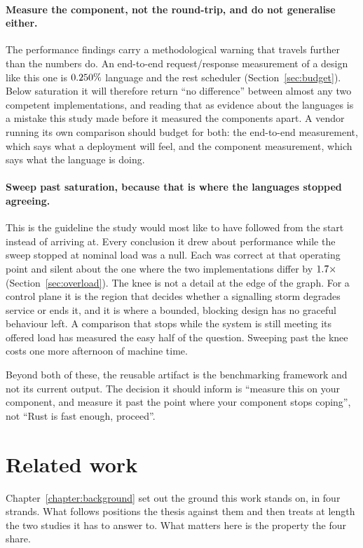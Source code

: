 \documentclass[english,oneside,a4paper,censored,csm,software-track-2020]{HYthesisML}
\begin{document}
\paragraph{Measure the component, not the round-trip, and do not generalise either.}
The performance findings carry a methodological warning that travels further than the
numbers do. An end-to-end request/response measurement of a design like this one is
$0.250\%$ language and the rest scheduler (Section~\ref{sec:budget}). Below
saturation it will therefore return ``no difference'' between almost any two competent
implementations, and reading that as evidence about the languages is a mistake this study made
before it measured the components apart. A vendor running its own comparison should budget for
both: the end-to-end measurement, which says what a deployment will feel, and the component
measurement, which says what the language is doing.

\paragraph{Sweep past saturation, because that is where the languages stopped agreeing.}
This is the guideline the study would most like to have followed from the start instead of
arriving at. Every conclusion it drew about performance while the sweep stopped at nominal load
was a null. Each was correct at that operating point and silent about the one where the two
implementations differ by $1.7\times$ (Section~\ref{sec:overload}). The knee is
not a detail at the edge of the graph. For a control plane it is the region that decides whether
a signalling storm degrades service or ends it, and it is where a bounded, blocking design has
no graceful behaviour left. A comparison that stops while the system is still meeting its
offered load has measured the easy half of the question. Sweeping past the knee costs one
more afternoon of machine time.

Beyond both of these, the reusable artifact is the benchmarking framework and not its current
output. The decision it should inform is ``measure this on your component, and measure it past
the point where your component stops coping'', not ``Rust is fast enough, proceed''.

\section{Related work}\label{sec:relatedwork}
Chapter~\ref{chapter:background} set out the ground this work stands on, in four strands. What
follows positions the thesis against them and then treats at length the two studies it has to
answer to. What matters here is the property the four share.
\end{document}
